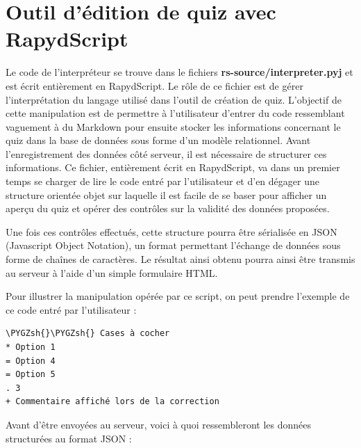 \documentclass[a4paper,11pt,openany,oneside]{sphinxmanual}
\def\PYGZsh{\char`\#}
\begin{document}
\chapter{Outil d'édition de quiz avec RapydScript}
\label{front-end::doc}\label{front-end:outil-d-edition-de-quiz-avec-rapydscript}
Le code de l'interpréteur se trouve dans le fichiers \textbf{rs-source/interpreter.pyj} et est écrit entièrement
en RapydScript. Le rôle de ce fichier est de gérer l'interprétation du langage utilisé dans l'outil
de création de quiz.
L'objectif de cette manipulation est de permettre à l'utilisateur
d'entrer du code ressemblant vaguement à du Markdown pour ensuite stocker les informations
concernant le quiz dans la base de données sous forme d'un modèle relationnel. Avant l'enregistrement
des données côté serveur, il est nécessaire de structurer ces informations. Ce fichier,
entièrement écrit en RapydScript, va dans un premier temps se charger de lire le code entré par l'utilisateur
et d'en dégager une structure orientée objet sur laquelle il est facile de se baser
pour afficher un aperçu du quiz et opérer des contrôles sur la validité des données
proposées.

Une fois ces contrôles effectués, cette structure pourra être sérialisée
en JSON (Javascript Object Notation), un format permettant l'échange de données sous
forme de chaînes de caractères. Le résultat ainsi obtenu pourra ainsi être
transmis au serveur à l'aide d'un simple formulaire HTML.

Pour illustrer la manipulation opérée par ce script, on peut prendre l'exemple
de ce code entré par l'utilisateur :

\begin{Verbatim}[commandchars=\\\{\}]
\PYGZsh{}\PYGZsh{} Cases à cocher
* Option 1
= Option 4
= Option 5
. 3
+ Commentaire affiché lors de la correction
\end{Verbatim}

Avant d'être envoyées au serveur, voici à quoi ressembleront les données structurées
au format JSON :
\end{document}
